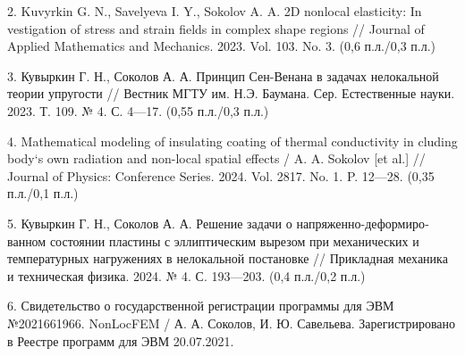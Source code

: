 2. Kuvyrkin G. N., Savelyeva I. Y., Sokolov A. A. 2D nonlocal elasticity: In vestigation of stress and strain fields in complex shape regions // Journal of Applied Mathematics and Mechanics. 2023. Vol. 103. No. 3. (0,6 п.л./0,3 п.л.)

3. Кувыркин Г. Н., Соколов А. А. Принцип Сен-Венана в задачах нело­кальной теории упругости // Вестник МГТУ им. Н.Э. Баумана. Сер. Естественные науки. 2023. Т. 109. № 4. С. 4—17. (0,55 п.л./0,3 п.л.)

4. Mathematical modeling of insulating coating of thermal conductivity in cluding body`s own radiation and non-local spatial effects / A. A. Sokolov [et al.] // Journal of Physics: Conference Series. 2024. Vol. 2817. No. 1. P. 12—28. (0,35 п.л./0,1 п.л.)

5. Кувыркин Г. Н., Соколов А. А. Решение задачи о напряженно-дефо\-рмиро­ванном состоянии пластины с эллиптическим вырезом при механических и температурных нагружениях в нелокальной постановке // Прикладная механика и техническая физика. 2024. № 4. С. 193—203. (0,4 п.л./0,2 п.л.)

6. Свидетельство о государственной регистрации программы для ЭВМ №2021661966. NonLocFEM / А. А. Соколов, И. Ю. Савельева. Зарегистрировано в Реестре программ для ЭВМ 20.07.2021.